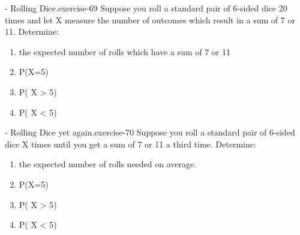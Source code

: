 \documentclass[10pt,]{book}
\numberwithin{equation}{section}
\begin{document}
%
\par
\hypertarget{p-1022}{}%
\begin{inlineexercise}{- Rolling Dice.}{exercise-69}%
\hypertarget{p-1023}{}%
Suppose you roll a standard pair of 6-sided dice 20 times and let X measure the number of outcomes which result in a sum of 7 or 11. Determine: \leavevmode%
\begin{enumerate}
\item\hypertarget{li-280}{}the expected number of rolls which have a sum of 7 or 11%
\item\hypertarget{li-281}{}P(X=5)%
\item\hypertarget{li-282}{}P( X > 5)%
\item\hypertarget{li-283}{}P( X < 5)%
\end{enumerate}
%
\end{inlineexercise}
%
\par
\hypertarget{p-1024}{}%
\begin{inlineexercise}{- Rolling Dice yet again.}{exercise-70}%
\hypertarget{p-1025}{}%
Suppose you roll a standard pair of 6-sided dice X times until you get a sum of 7 or 11 a third time. Determine: \leavevmode%
\begin{enumerate}
\item\hypertarget{li-284}{}the expected number of rolls needed on average.%
\item\hypertarget{li-285}{}P(X=5)%
\item\hypertarget{li-286}{}P( X > 5)%
\item\hypertarget{li-287}{}P( X < 5)%
\end{enumerate}
%
\end{inlineexercise}
%
\par
\hypertarget{p-1026}{}%
\end{document}
